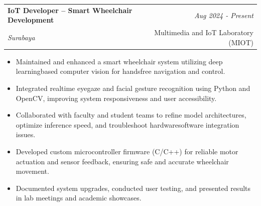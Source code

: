 \documentclass[a4paper,11pt]{article}
\makeatletter
\newcommand{\resumeSubheading}[4]{
\vspace{0.5mm}\item
    \begin{tabular*}{0.98\textwidth}[t]{l@{\extracolsep{\fill}}r}
        \textbf{#1} & \textit{\footnotesize{#4}} \\
        \textit{\footnotesize{#3}} &  \footnotesize{#2}\\
    \end{tabular*}
    \vspace{-2.4mm}
}
\newcommand{\resumeItemListStart}{\begin{justify}\begin{itemize}[leftmargin=3ex, rightmargin=2ex, noitemsep,labelsep=1.2mm,itemsep=0mm]\small}
\newcommand{\resumeItemListEnd}{\end{itemize}\end{justify}\vspace{-2mm}}
\makeatother
\begin{document}


\resumeSubheading
{IoT Developer – Smart Wheelchair Development}{Multimedia and IoT Laboratory (MIOT)}
{Surabaya}{Aug 2024 \-- Present}
\resumeItemListStart
\item {Maintained and enhanced a smart wheelchair system utilizing deep learning\-based computer vision for hands\-free navigation and control.}
\item {Integrated real\-time eye\-gaze and facial gesture recognition using Python and OpenCV, improving system responsiveness and user accessibility.}
\item {Collaborated with faculty and student teams to refine model architectures, optimize inference speed, and troubleshoot hardware\-software integration issues.}
\item {Developed custom microcontroller firmware (C/C++) for reliable motor actuation and sensor feedback, ensuring safe and accurate wheelchair movement.}
\item {Documented system upgrades, conducted user testing, and presented results in lab meetings and academic showcases.}
\resumeItemListEnd
\end{document}

